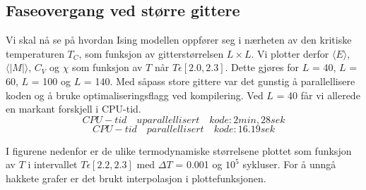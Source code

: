 \documentclass[11pt,a4paper]{article}
\begin{document}
\subsection{Faseovergang ved større gittere}
Vi skal nå se på hvordan Ising modellen oppfører seg i nærheten av den kritiske temperaturen $T_C$, som funksjon av gitterstørrelsen $L\times L$. Vi plotter derfor $\langle E \rangle$, $\langle |M| \rangle$, $C_V$ og $\chi$ som funksjon av $T$ når $T \epsilon [2.0, 2.3]$. Dette gjøres for $L$ = 40, $L$ = 60, $L$ = 100 og $L$ = 140. Med såpass store gittere var det gunstig å parallellisere koden og å bruke optimaliseringsflagg ved kompilering. Ved $L$ = 40 får vi allerede en markant forskjell i CPU-tid.
\[CPU-tid \quad uparallellisert \quad kode: 2 min, 28 sek \]
\[CPU-tid \quad parallellisert \quad kode: 16.19  sek  \]

I figurene nedenfor er de ulike termodynamiske størrelsene plottet som funksjon av $T$ i intervallet $T \epsilon [2.2, 2.3]$ med $\Delta T $ = 0.001 og $10^5$ sykluser. For å unngå hakkete grafer er det brukt interpolasjon i plottefunksjonen.
\end{document}
